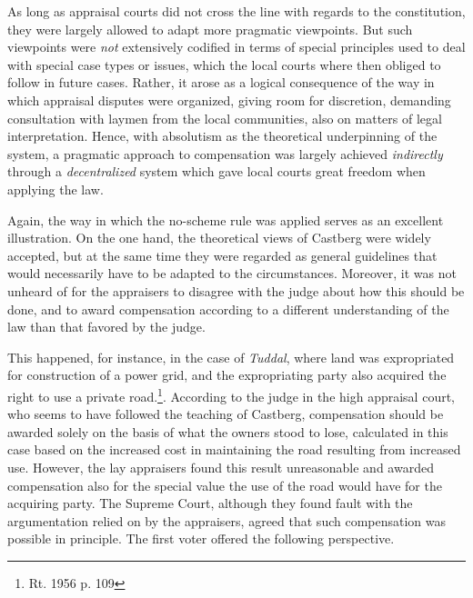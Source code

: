 \documentclass[10pt]{article} %
\begin{document}
As long as appraisal courts did not cross the line with regards to the constitution, they were largely allowed to adapt more pragmatic viewpoints. But such viewpoints were \emph{not} extensively codified in terms of special principles used to deal with special case types or issues, which the local courts where then obliged to follow in future cases. Rather, it arose as a logical consequence of the way in which appraisal disputes were organized, giving room for discretion, demanding consultation with laymen from the local communities, also on matters of legal interpretation. Hence, with absolutism as the theoretical underpinning of the system, a pragmatic approach to compensation was largely achieved \emph{indirectly} through a \emph{decentralized} system which gave local courts great freedom when applying the law. 

Again, the way in which the no-scheme rule was applied serves as an excellent illustration. On the one hand, the theoretical views of Castberg were widely accepted, but at the same time they were regarded as general guidelines that would necessarily have to be adapted to the circumstances. Moreover, it was not unheard of for the appraisers to disagree with the judge about how this should be done, and to award compensation according to a different understanding of the law than that favored by the judge. 

This happened, for instance, in the case of \emph{Tuddal}, where land was expropriated for construction of a power grid, and the expropriating party also acquired the right to use a private road.\footnote{Rt. 1956 p. 109}. According to the judge in the high appraisal court, who seems to have followed the teaching of Castberg, compensation should be awarded solely on the basis of what the owners stood to lose, calculated in this case based on the increased cost in maintaining the road resulting from increased use. However, the lay appraisers found this result unreasonable and awarded compensation also for the special value the use of the road would have for the acquiring party. The Supreme Court, although they found fault with the argumentation relied on by the appraisers, agreed that such compensation was possible in principle. The first voter offered the following perspective.
\end{document}
